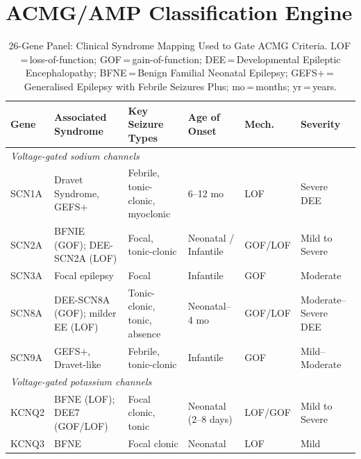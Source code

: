 \documentclass[12pt,a4paper]{article}
\begin{document}
\section{ACMG/AMP Classification Engine}
\label{sec:acmg}

\begin{table}[H]
\caption{26-Gene Panel: Clinical Syndrome Mapping Used to Gate ACMG Criteria.
  LOF\,=\,loss-of-function; GOF\,=\,gain-of-function;
  DEE\,=\,Developmental Epileptic Encephalopathy;
  BFNE\,=\,Benign Familial Neonatal Epilepsy;
  GEFS$+$\,=\,Generalised Epilepsy with Febrile Seizures Plus;
  mo\,=\,months; yr\,=\,years.}
\label{tab:genepanel}
\begin{center}
\scriptsize
\setlength{\tabcolsep}{3.5pt}
\begin{tabular}{p{1.1cm}p{3.8cm}p{3.8cm}p{2.2cm}p{0.8cm}p{2.2cm}}
\toprule
\textbf{Gene} & \textbf{Associated Syndrome} & \textbf{Key Seizure Types} & \textbf{Age of Onset} & \textbf{Mech.} & \textbf{Severity} \\
\midrule
\multicolumn{6}{l}{\textit{Voltage-gated sodium channels}} \\
SCN1A   & Dravet Syndrome, GEFS$+$                    & Febrile, tonic-clonic, myoclonic        & 6--12 mo              & LOF     & Severe DEE \\
SCN2A   & BFNIE (GOF); DEE-SCN2A (LOF)                & Focal, tonic-clonic                     & Neonatal / Infantile  & GOF/LOF & Mild to Severe \\
SCN3A   & Focal epilepsy                              & Focal                                   & Infantile             & GOF     & Moderate \\
SCN8A   & DEE-SCN8A (GOF); milder EE (LOF)            & Tonic-clonic, tonic, absence            & Neonatal--4 mo        & GOF/LOF & Moderate--Severe DEE \\
SCN9A   & GEFS$+$, Dravet-like                        & Febrile, tonic-clonic                   & Infantile             & GOF     & Mild--Moderate \\
\midrule
\multicolumn{6}{l}{\textit{Voltage-gated potassium channels}} \\
KCNQ2   & BFNE (LOF); DEE7 (GOF/LOF)                 & Focal clonic, tonic                     & Neonatal (2--8 days)  & LOF/GOF & Mild to Severe \\
KCNQ3   & BFNE                                        & Focal clonic                            & Neonatal              & LOF     & Mild \\
\midrule

\end{tabular}
\end{center}
\end{table}
\end{document}
